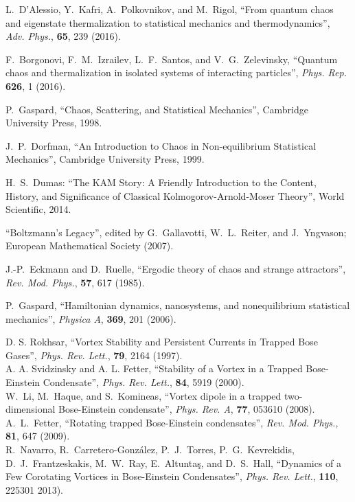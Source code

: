 \documentclass[a4paper, onecolumn]{revtex4-1}
\begin{document}
\begin{thebibliography}{1}


L.~D'Alessio, Y.~Kafri, A.~Polkovnikov, and M.~Rigol, 
``From quantum chaos and eigenstate thermalization to statistical mechanics and thermodynamics'', 
{\em Adv.
  Phys.}, {\bf 65}, 239 (2016).

F.~Borgonovi, F.~M.~Izrailev, L.~F.~Santos, and V.~G.~Zelevinsky,
``Quantum chaos and thermalization in isolated systems of interacting particles'', 
  {\em Phys. Rep.} {\bf 626}, 1 (2016).


P.~Gaspard, ``Chaos, Scattering, and Statistical Mechanics'', Cambridge University Press, 1998.

 J.~P.~Dorfman, ``An Introduction to Chaos in Non-equilibrium Statistical
  Mechanics'', Cambridge University Press, 1999.

 H.~S.~Dumas: ``The KAM Story: A Friendly Introduction to the Content,
History, and Significance of Classical Kolmogorov-Arnold-Moser Theory'', World Scientific, 2014. 

 ``Boltzmann's Legacy'', edited by G.~Gallavotti, W.~L.~Reiter, and
  J.~Yngvason; European Mathematical Society (2007).

  J.-P.~Eckmann and D.~Ruelle,
  ``Ergodic theory of chaos and strange attractors'', 
  \emph{Rev. Mod. Phys.}, {\bf 57}, 617  (1985).

P.~Gaspard, 
``Hamiltonian dynamics, nanosystems, and nonequilibrium statistical mechanics'', 
{\em Physica A}, {\bf 369}, 201 (2006). 


D. S. Rokhsar, 
``Vortex Stability and Persistent Currents in Trapped Bose Gases'', 
{\em Phys. Rev. Lett.}, {\bf 79}, 2164 (1997).
%
\\ 
%
A. A. Svidzinsky and A. L. Fetter, ``Stability of a Vortex in a Trapped Bose-Einstein Condensate'',
{\em Phys. Rev. Lett.}, {\bf 84}, 5919 (2000).
%
\\ 
%
W.~Li, M.~Haque, and S.~Komineas, 
``Vortex dipole in a trapped two-dimensional Bose-Einstein condensate'', 
{\em Phys. Rev. A}, {\bf 77}, 053610 (2008).
%
\\ 
%
A.~L.~Fetter, ``Rotating trapped Bose-Einstein condensates'', {\em Rev. Mod. Phys.}, {\bf 81}, 647
(2009).
%
\\ 
%
R.~Navarro, R.~Carretero-Gonz\'alez, P.~J.~Torres, P.~G.~Kevrekidis, D.~J.~Frantzeskakis, M.~W.~Ray,
E.~Altunta\c{s}, and D.~S.~Hall, 
``Dynamics of a Few Corotating Vortices in Bose-Einstein Condensates'', 
{\em Phys. Rev. Lett.}, {\bf 110}, 225301 2013).



\end{thebibliography}
\end{document}
